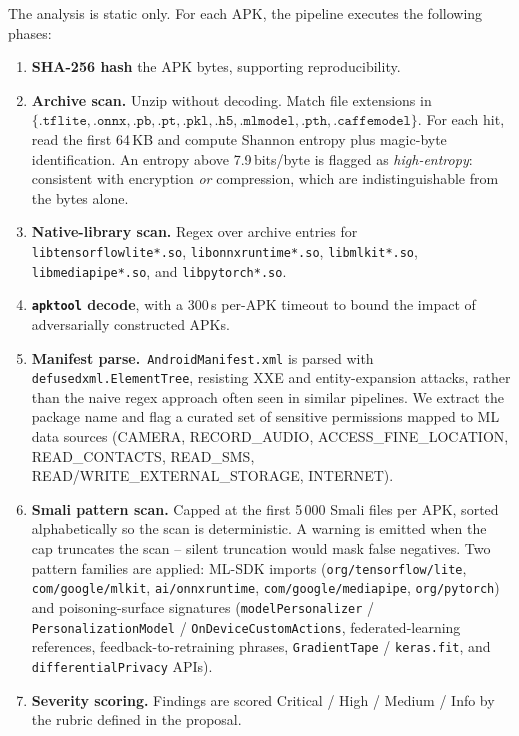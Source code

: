 \documentclass[conference]{IEEEtran}
\begin{document}
The analysis is static only. For each APK, the pipeline executes the
following phases:
\begin{enumerate}
\item \textbf{SHA-256 hash} the APK bytes, supporting reproducibility.
\item \textbf{Archive scan.} Unzip without decoding. Match file
  extensions in $\{\mathtt{.tflite}, \mathtt{.onnx}, \mathtt{.pb},
  \mathtt{.pt}, \mathtt{.pkl}, \mathtt{.h5}, \mathtt{.mlmodel},
  \mathtt{.pth}, \mathtt{.caffemodel}\}$. For each hit, read the first
  64\,KB and compute Shannon entropy plus magic-byte identification.
  An entropy above 7.9\,bits/byte is flagged as \emph{high-entropy}:
  consistent with encryption \emph{or} compression, which are
  indistinguishable from the bytes alone.
\item \textbf{Native-library scan.} Regex over archive entries for
  \texttt{libtensorflowlite*.so}, \texttt{libonnxruntime*.so},
  \texttt{libmlkit*.so}, \texttt{libmediapipe*.so}, and
  \texttt{libpytorch*.so}.
\item \textbf{\texttt{apktool} decode}, with a 300\,s per-APK timeout
  to bound the impact of adversarially constructed APKs.
\item \textbf{Manifest parse.}~\texttt{AndroidManifest.xml} is parsed
  with \texttt{defusedxml.ElementTree}, resisting XXE and
  entity-expansion attacks, rather than the naive regex approach often
  seen in similar pipelines. We extract the package name and flag a
  curated set of sensitive permissions mapped to ML data sources
  (CAMERA, RECORD\_AUDIO, ACCESS\_FINE\_LOCATION, READ\_CONTACTS,
  READ\_SMS, READ/WRITE\_EXTERNAL\_STORAGE, INTERNET).
\item \textbf{Smali pattern scan.} Capped at the first 5\,000 Smali
  files per APK, sorted alphabetically so the scan is deterministic.
  A warning is emitted when the cap truncates the scan -- silent
  truncation would mask false negatives. Two pattern families are
  applied: ML-SDK imports (\texttt{org/tensorflow/lite},
  \texttt{com/google/mlkit}, \texttt{ai/onnxruntime},
  \texttt{com/google/mediapipe}, \texttt{org/pytorch}) and
  poisoning-surface signatures (\texttt{modelPersonalizer} /
  \texttt{PersonalizationModel} / \texttt{OnDeviceCustomActions},
  federated-learning references, feedback-to-retraining phrases,
  \texttt{GradientTape} / \texttt{keras.fit}, and
  \texttt{differentialPrivacy} APIs).
\item \textbf{Severity scoring.} Findings are scored Critical / High /
  Medium / Info by the rubric defined in the proposal.
\end{enumerate}
\end{document}
